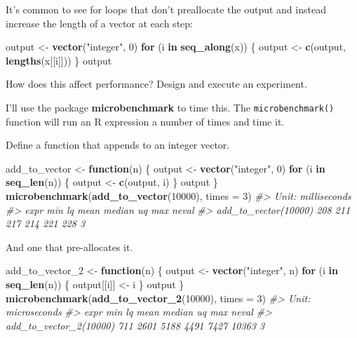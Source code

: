 \documentclass[]{book}
\newenvironment{Shaded}{\begin{snugshade}}{\end{snugshade}}
\newcommand{\CommentTok}[1]{\textcolor[rgb]{0.56,0.35,0.01}{\textit{#1}}}
\newcommand{\ControlFlowTok}[1]{\textcolor[rgb]{0.13,0.29,0.53}{\textbf{#1}}}
\newcommand{\DataTypeTok}[1]{\textcolor[rgb]{0.13,0.29,0.53}{#1}}
\newcommand{\DecValTok}[1]{\textcolor[rgb]{0.00,0.00,0.81}{#1}}
\newcommand{\KeywordTok}[1]{\textcolor[rgb]{0.13,0.29,0.53}{\textbf{#1}}}
\newcommand{\NormalTok}[1]{#1}
\newcommand{\StringTok}[1]{\textcolor[rgb]{0.31,0.60,0.02}{#1}}
\theoremstyle{plain}
\theoremstyle{remark}
\begin{document}
It's common to see for loops that don't preallocate the output and
instead increase the length of a vector at each step:

\begin{Shaded}
\begin{Highlighting}[]
\NormalTok{output <-}\StringTok{ }\KeywordTok{vector}\NormalTok{(}\StringTok{"integer"}\NormalTok{, }\DecValTok{0}\NormalTok{)}
\ControlFlowTok{for}\NormalTok{ (i }\ControlFlowTok{in} \KeywordTok{seq_along}\NormalTok{(x)) \{}
\NormalTok{  output <-}\StringTok{ }\KeywordTok{c}\NormalTok{(output, }\KeywordTok{lengths}\NormalTok{(x[[i]]))}
\NormalTok{\}}
\NormalTok{output}
\end{Highlighting}
\end{Shaded}

How does this affect performance? Design and execute an experiment.

I'll use the package \textbf{microbenchmark} to time this. The
\texttt{microbenchmark()} function will run an R expression a number of
times and time it.

Define a function that appends to an integer vector.

\begin{Shaded}
\begin{Highlighting}[]
\NormalTok{add_to_vector <-}\StringTok{ }\ControlFlowTok{function}\NormalTok{(n) \{}
\NormalTok{  output <-}\StringTok{ }\KeywordTok{vector}\NormalTok{(}\StringTok{"integer"}\NormalTok{, }\DecValTok{0}\NormalTok{)}
  \ControlFlowTok{for}\NormalTok{ (i }\ControlFlowTok{in} \KeywordTok{seq_len}\NormalTok{(n)) \{}
\NormalTok{    output <-}\StringTok{ }\KeywordTok{c}\NormalTok{(output, i)}
\NormalTok{  \}}
\NormalTok{  output  }
\NormalTok{\}}
\KeywordTok{microbenchmark}\NormalTok{(}\KeywordTok{add_to_vector}\NormalTok{(}\DecValTok{10000}\NormalTok{), }\DataTypeTok{times =} \DecValTok{3}\NormalTok{)}
\CommentTok{#> Unit: milliseconds}
\CommentTok{#>                  expr min  lq mean median  uq max neval}
\CommentTok{#>  add_to_vector(10000) 208 211  217    214 221 228     3}
\end{Highlighting}
\end{Shaded}

And one that pre-allocates it.

\begin{Shaded}
\begin{Highlighting}[]
\NormalTok{add_to_vector_}\DecValTok{2}\NormalTok{ <-}\StringTok{ }\ControlFlowTok{function}\NormalTok{(n) \{}
\NormalTok{  output <-}\StringTok{ }\KeywordTok{vector}\NormalTok{(}\StringTok{"integer"}\NormalTok{, n)}
  \ControlFlowTok{for}\NormalTok{ (i }\ControlFlowTok{in} \KeywordTok{seq_len}\NormalTok{(n)) \{}
\NormalTok{    output[[i]] <-}\StringTok{ }\NormalTok{i}
\NormalTok{  \}}
\NormalTok{  output}
\NormalTok{\}}
\KeywordTok{microbenchmark}\NormalTok{(}\KeywordTok{add_to_vector_2}\NormalTok{(}\DecValTok{10000}\NormalTok{), }\DataTypeTok{times =} \DecValTok{3}\NormalTok{)}
\CommentTok{#> Unit: microseconds}
\CommentTok{#>                    expr min   lq mean median   uq   max neval}
\CommentTok{#>  add_to_vector_2(10000) 711 2601 5188   4491 7427 10363     3}
\end{Highlighting}
\end{Shaded}
\end{document}
